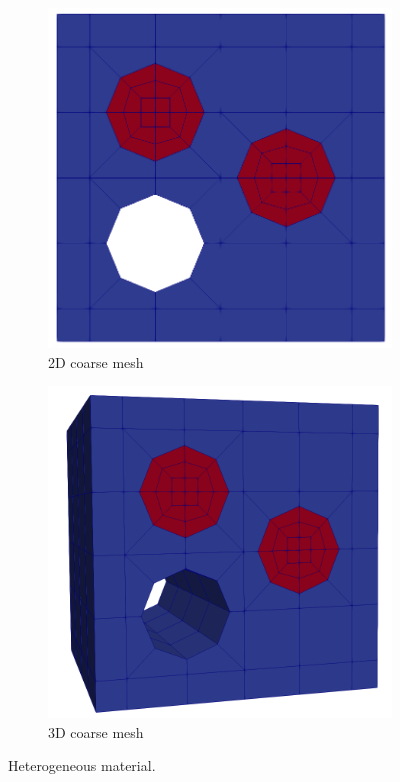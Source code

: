 \documentclass[preprint,12pt,times]{elsarticle}
\begin{document}
\begin{figure}[!ht]
  \centering
  \begin{subfigure}[b]{0.45\textwidth}
      \centering
      \includegraphics[width=\textwidth]{coarse_mesh.png}
      \caption{2D coarse mesh}
  \end{subfigure}
  \begin{subfigure}[b]{0.45\textwidth}
    \centering
    \includegraphics[width=\textwidth]{coarse_mesh_3d.png}
    \caption{3D coarse mesh}
  \end{subfigure}
  \caption{Heterogeneous material.}%
  \label{fig:miehe}
\end{figure}
\end{document}
